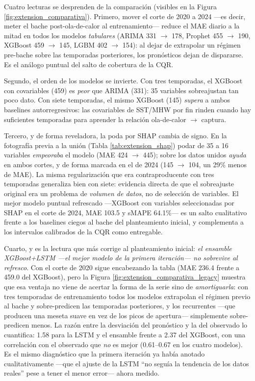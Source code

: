 Cuatro lecturas se desprenden de la comparación (visibles en la Figura \ref{fig:extension_comparativa}). Primero, mover el corte de 2020 a 2024 ---es decir, meter el bache post-ola-de-calor al entrenamiento--- reduce el MAE diario a la mitad en todos los modelos \emph{tabulares} (ARIMA 331 $\to$ 178, Prophet 455 $\to$ 190, XGBoost 459 $\to$ 145, LGBM 402 $\to$ 154): al dejar de extrapolar un régimen pre-bache sobre las temporadas posteriores, los pronósticos dejan de dispararse. Es el análogo puntual del salto de cobertura de la CQR.

Segundo, el orden de los modelos se invierte. Con tres temporadas, el XGBoost con covariables (459) es \emph{peor} que ARIMA (331): 35 variables sobreajustan tan poco dato. Con siete temporadas, el mismo XGBoost (145) \emph{supera} a ambos baselines autorregresivos: las covariables de SST/MHW por fin rinden cuando hay suficientes temporadas para aprender la relación ola-de-calor $\to$ captura.

Tercero, y de forma reveladora, la poda por SHAP cambia de signo. En la fotografía previa a la unión (Tabla \ref{tab:extension_shap}) podar de 35 a 16 variables \emph{empeoraba} el modelo (MAE 424 $\to$ 445); sobre los datos unidos \emph{ayuda} en ambos cortes, y de forma marcada en el de 2024 (145 $\to$ 104, un 29\% menos de MAE). La misma regularización que era contraproducente con tres temporadas generaliza bien con siete: evidencia directa de que el sobreajuste original era un problema de \emph{volumen de datos}, no de selección de variables. El mejor modelo puntual refrescado ---XGBoost con variables seleccionadas por SHAP en el corte de 2024, MAE 103.5 y sMAPE 64.1\%--- es un salto cualitativo frente a los baselines ciegos al bache del planteamiento inicial, y complementa a los intervalos calibrados de la CQR como entregable.

Cuarto, y es la lectura que más corrige al planteamiento inicial: \emph{el ensamble XGBoost+LSTM ---el mejor modelo de la primera iteración--- no sobrevive al refresco}. Con el corte de 2020 sigue encabezando la tabla (MAE 236.4 frente a 459.0 del XGBoost), pero la Figura \ref{fig:extension_comparativa_legacy} muestra que esa ventaja no viene de acertar la forma de la serie sino de \emph{amortiguarla}: con tres temporadas de entrenamiento todos los modelos extrapolan el régimen previo al bache y sobre-predicen las temporadas posteriores, y los recurrentes ---que producen una meseta suave en vez de los picos de apertura--- simplemente sobre-predicen menos. La razón entre la desviación del pronóstico y la del observado lo cuantifica: 1.58 para la LSTM y el ensamble frente a 2.37 del XGBoost, con una correlación con el observado que \emph{no} es mejor (0.61--0.67 en los cuatro modelos). Es el mismo diagnóstico que la primera iteración ya había anotado cualitativamente ---que el ajuste de la LSTM ``no seguía la tendencia de los datos reales'' pese a tener el menor error--- ahora medido.

